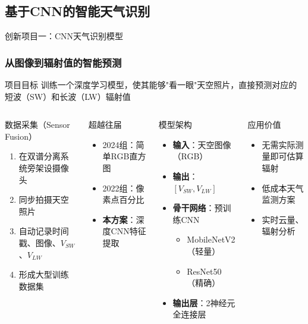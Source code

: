 \documentclass[aspectratio=169,11pt]{ctexbeamer}
\begin{document}
\subsection{基于CNN的智能天气识别}

\begin{frame}{创新项目一：CNN天气识别模型}
\frametitle{从图像到辐射值的智能预测}
\begin{block}{项目目标}
训练一个深度学习模型，使其能够"看一眼"天空照片，直接预测对应的短波（SW）和长波（LW）辐射值
\end{block}

\begin{columns}
\begin{block}{数据采集（Sensor Fusion）}
\begin{enumerate}
    \item 在双谱分离系统旁架设摄像头
    \item 同步拍摄天空照片
    \item 自动记录时间戳、图像、$V_{SW}$、$V_{LW}$
    \item 形成大型训练数据集
\end{enumerate}
\end{block}

\begin{alertblock}{超越往届}
\begin{itemize}
    \item 2024组：简单RGB直方图
    \item 2022组：像素点百分比
    \item \textbf{本方案}：深度CNN特征提取
\end{itemize}
\end{alertblock}

\begin{block}{模型架构}
\begin{itemize}
    \item \textbf{输入}：天空图像（RGB）
    \item \textbf{输出}：$[V_{SW}, V_{LW}]$
    \item \textbf{骨干网络}：预训练CNN
    \begin{itemize}
        \item MobileNetV2（轻量）
        \item ResNet50（精确）
    \end{itemize}
    \item \textbf{输出层}：2神经元全连接层
\end{itemize}
\end{block}

\begin{block}{应用价值}
\begin{itemize}
    \item 无需实际测量即可估算辐射
    \item 低成本天气监测方案
    \item 实时云量、辐射分析
\end{itemize}
\end{block}
\end{columns}
\end{frame}
\end{document}
